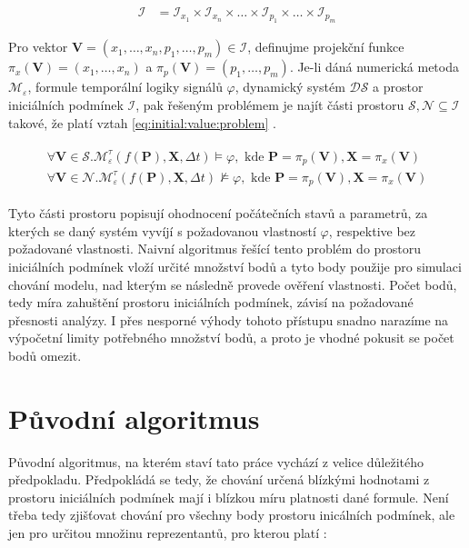 \begin{align}
\mathcal{I} &= \mathcal{I}_{x_1} \times \mathcal{I}_{x_n} \times \ldots \times \mathcal{I}_{p_1} \times \ldots \times \mathcal{I}_{p_m}
\end{align}

Pro vektor $\mathbf{V} = (x_1, \ldots, x_n, p_1, \ldots, p_m) \in \mathcal{I}$, definujme projekční funkce $\pi_x(\mathbf{V}) = (x_1, \ldots, x_n)$
a $\pi_p(\mathbf{V}) = (p_1, \ldots, p_m)$. Je-li dáná numerická metoda $\mathcal{M}_\varepsilon$,
formule temporální logiky signálů $\varphi$, dynamický systém $\mathcal{DS}$
a prostor iniciálních podmínek $\mathcal{I}$, pak řešeným problémem je najít
části prostoru $\mathcal{S}, \mathcal{N} \subseteq \mathcal{I}$ takové, že platí
vztah \ref{eq:initial:value:problem} \cite[str. 23]{drazan2011}.

\begin{align}\label{eq:initial:value:problem}
\begin{array}{ll}
\forall \mathbf{V} \in \mathcal{S} . \mathcal{M}^\tau_\varepsilon(f(\mathbf{P}), \mathbf{X}, \Delta t) \models \varphi, \textrm{~kde~} \mathbf{P} = \pi_p(\mathbf{V}), \mathbf{X} = \pi_x(\mathbf{V}) \\
\forall \mathbf{V} \in \mathcal{N} . \mathcal{M}^\tau_\varepsilon(f(\mathbf{P}), \mathbf{X}, \Delta t) \not\models \varphi, \textrm{~kde~} \mathbf{P} = \pi_p(\mathbf{V}), \mathbf{X} = \pi_x(\mathbf{V})
\end{array}
\end{align}

Tyto části prostoru popisují ohodnocení počátečních stavů a parametrů, za kterých se daný systém vyvíjí
s požadovanou vlastností $\varphi$, respektive bez po\-ža\-do\-vané vlastnosti. Naivní algoritmus řešící
tento problém do prostoru iniciálních podmínek vloží určité množství bodů a tyto body
použije pro simulaci chování modelu, nad kterým se následně provede ověření vlastnosti.
Počet bodů, tedy míra zahuštění prostoru iniciálních podmínek, závisí na požadované přesnosti
analýzy. I přes nesporné výhody tohoto přístupu snadno narazíme na výpočetní limity
potřebného množství bodů, a proto je vhodné pokusit se počet bodů omezit.


\section{Původní algoritmus}

Původní algoritmus, na kterém staví tato práce vychází z velice důležitého předpokladu.
 Předpokládá se tedy, že chování určená blízkými
hodnotami z prostoru iniciálních podmínek mají i blízkou míru platnosti dané formule.
Není třeba tedy zjišťovat chování pro všechny body prostoru inicálních podmínek,
ale jen pro určitou množinu reprezentantů, pro kterou platí \cite[str. 25]{drazan2011}:

